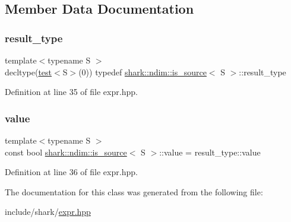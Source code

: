 \subsection{Member Data Documentation}
\hypertarget{classshark_1_1ndim_1_1is__source_a8f572031c798bd5661798790582835b2}{}\label{classshark_1_1ndim_1_1is__source_a8f572031c798bd5661798790582835b2} 
\subsubsection{\texorpdfstring{result\+\_\+type}{result\_type}}
{\footnotesize\ttfamily template$<$typename S $>$ \\
decltype(\hyperlink{classshark_1_1ndim_1_1is__source_a3aae092d2fe4e1593d3997fa4c33c27b}{test}$<$S$>$(0)) typedef \hyperlink{classshark_1_1ndim_1_1is__source}{shark\+::ndim\+::is\+\_\+source}$<$ S $>$\+::result\+\_\+type}



Definition at line 35 of file expr.\+hpp.

\hypertarget{classshark_1_1ndim_1_1is__source_a454596d26b3920a0a3e99ebc76362e7c}{}\label{classshark_1_1ndim_1_1is__source_a454596d26b3920a0a3e99ebc76362e7c} 
\subsubsection{\texorpdfstring{value}{value}}
{\footnotesize\ttfamily template$<$typename S $>$ \\
const bool \hyperlink{classshark_1_1ndim_1_1is__source}{shark\+::ndim\+::is\+\_\+source}$<$ S $>$\+::value = result\+\_\+type\+::value\hspace{0.3cm}{\ttfamily [static]}}



Definition at line 36 of file expr.\+hpp.



The documentation for this class was generated from the following file\+:\begin{DoxyCompactItemize}
\item 
include/shark/\hyperlink{expr_8hpp}{expr.\+hpp}\end{DoxyCompactItemize}
